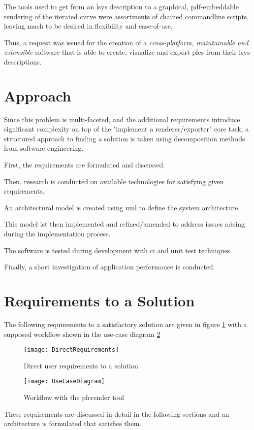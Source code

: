 The tools used to get from an \gls{lsys} description to a graphical, pdf-embeddable rendering of the iterated curve were assortments of chained commandline scripts, leaving much to be desired in flexibility and ease-of-use.

Thus, a request was issued for the creation of a \emph{cross-platform, maintainable and extensible} software that is able to create, visualize and export \gls{pfc}s from their \gls{lsys} descriptions.

\section{Approach}

Since this problem is multi-faceted, and the additional requirements introduce significant complexity on top of the "implement a renderer/exporter" core task, a structured approach to finding a solution is taken using decomposition methods from software engineering.

First, the requirements are formulated and discussed.

Then, research is conducted on available technologies for satisfying given requirements.

An architectural model is created using \gls{uml} to define the system architecture.

This model ist then implemented and refined/amended to address issues arising during the implementation process.

The software is tested during development with \gls{ci} and \gls{unit test} techniques.

Finally, a short investigation of application performance is conducted.

\section{Requirements to a Solution}
The following requirements to a satisfactory solution are given in figure \ref{fig:directreq} with a supposed workflow shown in the use-case diagram \ref{fig:uc}

\begin{figure}[h]
	\texttt{[image: DirectRequirements]}
	\caption{Direct user requirements to a solution}
	\label{fig:directreq}
\end{figure}


\begin{figure}
	\texttt{[image: UseCaseDiagram]}
	\caption{Workflow with the pfcrender tool}
	\label{fig:uc}
\end{figure}

These requirements are discussed in detail in the following sections and an architecture is formulated that satisfies them.
